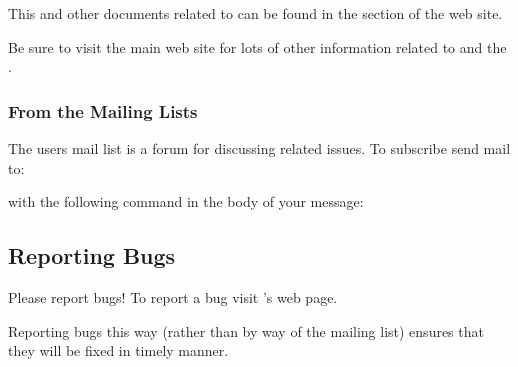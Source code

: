 This and other documents related to \sr{} can be found in the
 section of the
\htmladdnormallinkfoot{\sci{}}{\sciurl{}} web site.

Be sure to visit the main \sci{} web site for lots of other
information related to \sr{} and the \scii{}.

\subsubsection{From the Mailing Lists}

The \sr{} users mail list is a forum for discussing \sr{} related issues.
To subscribe send mail to:


with the following command in the body of your message:


\subsection{Reporting Bugs}
\label{sec:bugs}

Please report bugs!  To report a bug visit \sr{}'s
 web page.

Reporting bugs this way (rather than by way of the mailing list) ensures
that they will be fixed in timely manner.




